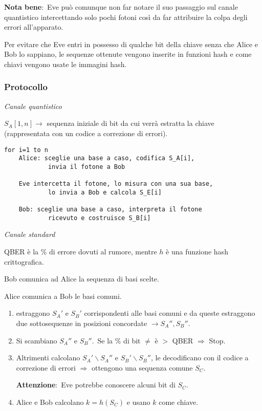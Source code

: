 \vspace{12pt}
\noindent\textbf{Nota bene}:\ Eve può comunque non far notare il suo passaggio sul canale quantistico intercettando solo pochi fotoni così da far attribuire la colpa degli errori all'apparato.\
\vspace{12pt}

\noindent Per evitare che Eve entri in possesso di qualche bit della chiave senza che Alice e Bob lo sappiano, le sequenze ottenute vengono inserite in funzioni hash e  come chiavi vengono usate le immagini hash.\

\newpage

\subsubsection{Protocollo}

\textit{Canale quantistico}
\vspace{12pt}

\noindent $S_A[1,n] \rightarrow$ sequenza iniziale di bit da cui verrà estratta la chiave (rappresentata con un codice a correzione di errori).\

\begin{verbatim}
for i=1 to n
    Alice: sceglie una base a caso, codifica S_A[i],
            invia il fotone a Bob

    Eve intercetta il fotone, lo misura con una sua base,
            lo invia a Bob e calcola S_E[i]

    Bob: sceglie una base a caso, interpreta il fotone
            ricevuto e costruisce S_B[i]
\end{verbatim}

\noindent\textit{Canale standard}
\vspace{12pt}

\noindent QBER è la \% di errore dovuti al rumore, mentre $h$ è una funzione hash crittografica.

\begin{flushleft}
    Bob comunica ad Alice la sequenza di basi scelte.

    Alice comunica a Bob le basi comuni.
\end{flushleft}

\begin{enumerate}
    \item estraggono $S_A'$ e $S_B'$ corrispondenti alle basi comuni e da queste estraggono due sottosequenze in posizioni concordate $\rightarrow S_A'', S_B''$.
    \item Si scambiano $S_A''$ e $S_B''$.\ Se la \% di bit $\neq$ è $>$ QBER $\Rightarrow$ Stop.
    \item Altrimenti calcolano $S_A' \backslash S_A''$ e $S_B' \backslash S_B''$, le decodificano con il codice a correzione di errori $\Rightarrow$ ottengono una sequenza comune $S_C$.
          \begin{center}
              \textbf{Attenzione}:\ Eve potrebbe conoscere alcuni bit di $S_C$.\
          \end{center}
    \item Alice e Bob calcolano $k = h(S_C)$ e usano $k$ come chiave.\
\end{enumerate}


